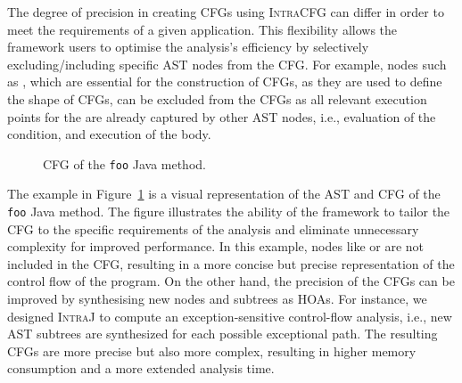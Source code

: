 The degree of precision in creating CFGs using \textsc{IntraCFG} can differ in order
to meet the requirements of a given application.
This ﬂexibility allows the framework users to optimise the analysis's eﬃciency 
by selectively excluding/including specific AST nodes from the CFG.
For example, nodes such as , which are essential for the
construction of CFGs, as they are used to define the shape of CFGs, can be excluded
from the CFGs as all relevant execution points for the  are
already captured by other AST nodes, i.e., evaluation of the condition, and execution
of the body.
\begin{figure}[H]
	\centering
	\caption{\label{fig:CFG} CFG of the \texttt{foo} Java method.}
\end{figure}

The example in Figure~\ref{fig:CFG} is a visual representation of the AST and CFG of the
\texttt{foo} Java method. The figure illustrates the ability of the framework to tailor the CFG
to the specific requirements of the analysis and eliminate unnecessary complexity for improved performance.
In this example, nodes like  or  are not included in the CFG,
resulting in a more concise but precise representation of the control flow of the program.
On the other hand, the precision of the CFGs can be improved by synthesising new nodes and subtrees as HOAs.
For instance, we designed \textsc{IntraJ} to compute an exception-sensitive
control-flow analysis, i.e., new AST subtrees are synthesized for each possible exceptional path.
The resulting CFGs are more precise but also more complex, resulting
in higher memory consumption and a more extended analysis time.



